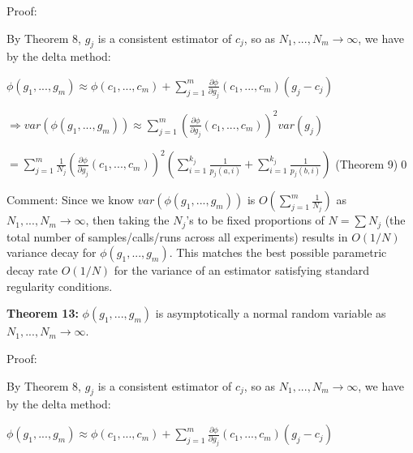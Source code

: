 \documentclass{article}
\begin{document}
Proof:

By Theorem 8, $\displaystyle g_{j}$ is a consistent estimator of $\displaystyle c_{j}$, so as $\displaystyle N_{1} ,...,N_{m}\rightarrow \infty $, we have by the delta method:

$\displaystyle \phi \left( g_{1} ,...,g_{m}\right) \approx \phi \left( c_{1} ,...,c_{m}\right) +\sum _{j=1}^{m}\frac{\partial \phi }{\partial g_{j}}\left( c_{1} ,...,c_{m}\right)\left( g_{j} -c_{j}\right)$ 

$\displaystyle \Longrightarrow var\left( \phi \left( g_{1} ,...,g_{m}\right)\right) \approx \sum _{j=1}^{m}\left(\frac{\partial \phi }{\partial g_{j}}\left( c_{1} ,...,c_{m}\right)\right)^{2} var\left( g_{j}\right)$

$\displaystyle =\sum _{j=1}^{m}\frac{1}{N_{j}}\left(\frac{\partial \phi }{\partial g_{j}}\left( c_{1} ,...,c_{m}\right)\right)^{2}\left(\sum _{i=1}^{k_{j}}\frac{1}{p_{j}\left( a,i\right)} +\sum _{i=1}^{k_{j}}\frac{1}{p_{j}\left( b,i\right)}\right)$ (Theorem 9)\qed 



Comment: Since we know $\displaystyle var\left( \phi \left( g_{1} ,...,g_{m}\right)\right)$ is $\displaystyle O\left(\sum _{j=1}^{m}\frac{1}{N_{j}}\right)$ as $\displaystyle N_{1} ,...,N_{m}\rightarrow \infty $, then taking the $\displaystyle N_{j}$'s to be fixed proportions of $\displaystyle N=\sum N_{j}$ (the total number of samples/calls/runs across all experiments) results in $\displaystyle O\left( 1/N\right)$ variance decay for $\displaystyle \phi \left( g_{1} ,...,g_{m}\right)$. This matches the best possible parametric decay rate $\displaystyle O\left( 1/N\right)$ for the variance of an estimator satisfying standard regularity conditions.



\textbf{Theorem 13:} $\displaystyle \phi \left( g_{1} ,...,g_{m}\right)$ is asymptotically a normal random variable as $\displaystyle N_{1} ,...,N_{m}\rightarrow \infty $.



Proof: 

By Theorem 8, $\displaystyle g_{j}$ is a consistent estimator of $\displaystyle c_{j}$, so as $\displaystyle N_{1} ,...,N_{m}\rightarrow \infty $, we have by the delta method:

$\displaystyle \phi \left( g_{1} ,...,g_{m}\right) \approx \phi \left( c_{1} ,...,c_{m}\right) +\sum _{j=1}^{m}\frac{\partial \phi }{\partial g_{j}}\left( c_{1} ,...,c_{m}\right)\left( g_{j} -c_{j}\right)$ 
\end{document}
